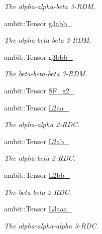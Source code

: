 \begin{DoxyCompactItemize}
\begin{DoxyCompactList}\small\item\em The alpha-\/alpha-\/beta 3-\/\+R\+DM. \end{DoxyCompactList}\item 
ambit\+::\+Tensor \mbox{\hyperlink{classforte_1_1_r_d_ms_a2cfeeab0cedb939afc26e566bdf9666c}{g3abb\+\_\+}}
\begin{DoxyCompactList}\small\item\em The alpha-\/beta-\/beta 3-\/\+R\+DM. \end{DoxyCompactList}\item 
ambit\+::\+Tensor \mbox{\hyperlink{classforte_1_1_r_d_ms_aff38934d2dc1de789c604541edcc56da}{g3bbb\+\_\+}}
\begin{DoxyCompactList}\small\item\em The beta-\/beta-\/beta 3-\/\+R\+DM. \end{DoxyCompactList}\item 
ambit\+::\+Tensor \mbox{\hyperlink{classforte_1_1_r_d_ms_aebf8feec52be8b76d8e281598e6c2727}{S\+F\+\_\+g2\+\_\+}}
\item 
ambit\+::\+Tensor \mbox{\hyperlink{classforte_1_1_r_d_ms_ad20c6fafc4ce95e8401534eef6bb8088}{L2aa\+\_\+}}
\begin{DoxyCompactList}\small\item\em The alpha-\/alpha 2-\/\+R\+DC. \end{DoxyCompactList}\item 
ambit\+::\+Tensor \mbox{\hyperlink{classforte_1_1_r_d_ms_a0b0728d29790738a6f67c373266ff8ea}{L2ab\+\_\+}}
\begin{DoxyCompactList}\small\item\em The alpha-\/beta 2-\/\+R\+DC. \end{DoxyCompactList}\item 
ambit\+::\+Tensor \mbox{\hyperlink{classforte_1_1_r_d_ms_a01d91dc03ed0517ac7f88e2a07b7f56b}{L2bb\+\_\+}}
\begin{DoxyCompactList}\small\item\em The beta-\/beta 2-\/\+R\+DC. \end{DoxyCompactList}\item 
ambit\+::\+Tensor \mbox{\hyperlink{classforte_1_1_r_d_ms_ad39c92ff3f82e30968b0bf02c8a10fda}{L3aaa\+\_\+}}
\begin{DoxyCompactList}\small\item\em The alpha-\/alpha-\/alpha 3-\/\+R\+DC. \end{DoxyCompactList}\item 

\end{DoxyCompactItemize}
